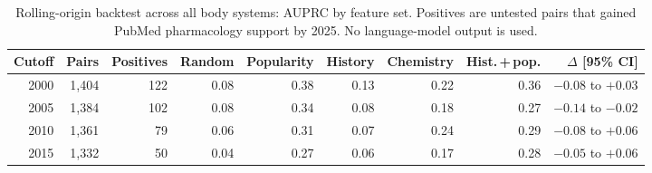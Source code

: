\documentclass[11pt,a4paper]{article}
\begin{document}
\begin{table}[h]
\centering\small
\caption{Rolling-origin backtest across all body systems: AUPRC by feature set. Positives are untested pairs that gained PubMed pharmacology support by 2025. No language-model output is used.}
\label{tab:backtest}
\begin{tabular}{@{}rrrrrrrrr@{}}
\toprule
Cutoff & Pairs & Positives & Random & Popularity & History & Chemistry & Hist.\,+\,pop. & $\Delta$ [95\% CI] \\
\midrule
2000 & 1,404 & 122 & 0.08 & 0.38 & 0.13 & 0.22 & 0.36 & $-0.08$ to $+0.03$ \\
2005 & 1,384 & 102 & 0.08 & 0.34 & 0.08 & 0.18 & 0.27 & $-0.14$ to $-0.02$ \\
2010 & 1,361 & 79 & 0.06 & 0.31 & 0.07 & 0.24 & 0.29 & $-0.08$ to $+0.06$ \\
2015 & 1,332 & 50 & 0.04 & 0.27 & 0.06 & 0.17 & 0.28 & $-0.05$ to $+0.06$ \\
\bottomrule
\end{tabular}
\end{table}
\end{document}
